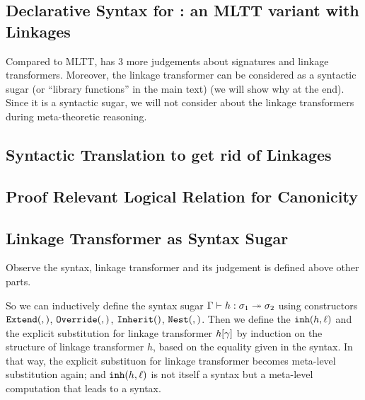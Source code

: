 \subsection{Declarative Syntax for \TT : an MLTT variant with Linkages}
Compared to MLTT, \TT has 3 more judgements about signatures and linkage transformers. Moreover, the linkage transformer can be considered as a syntactic sugar (or ``library functions'' in the main text) (we will show why at the end). 
Since it is a syntactic sugar, we will not consider about the linkage transformers during meta-theoretic reasoning.









\subsection{Syntactic Translation to get rid of Linkages}




% 


\subsection{Proof Relevant Logical Relation for Canonicity}


\subsection{Linkage Transformer as Syntax Sugar}
Observe the syntax, linkage transformer and its judgement is defined above 
other parts. 

So we can inductively define the syntax sugar $ {\Gamma} \vdash {h} : {\sigma_1} \twoheadrightarrow {\ensuremath{\sigma}_2}$ using constructors $\texttt{Extend}({},{})$, $\texttt{Override}({},{})$, $\texttt{Inherit}({})$, $\texttt{Nest}({},{})$. Then we define the $\texttt{inh}({h},{\ell})$ and the explicit substitution for linkage transformer ${h}\!\left[{\gamma}\right]$ by induction on the structure of linkage transformer $h$, based on the equality
given in the syntax. In that way, the explicit substituon for linkage transformer becomes meta-level substitution again; and $\texttt{inh}({h},{\ell})$ is not itself a syntax but a meta-level computation that leads to a syntax.